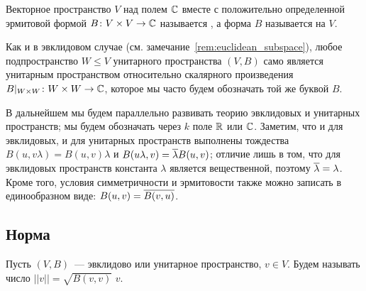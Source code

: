 \begin{definition}
Векторное пространство $V$ над полем $\mathbb C$ вместе с положительно
определенной эрмитовой формой $B\colon V\times V\to\mathbb
C$ называется , а форма $B$ называется
 на $V$.
\end{definition}

\begin{remark}
Как и в эвклидовом случае
(см. замечание~\ref{rem:euclidean_subspace}), любое подпространство
$W\leq V$ унитарного
пространства $(V,B)$ само 
является унитарным пространством относительно скалярного произведения
$B|_{W\times W}\colon W\times W\to\mathbb C$, которое мы часто будем
обозначать той же буквой $B$.
\end{remark}

В дальнейшем мы будем параллельно развивать теорию эвклидовых и
унитарных пространств; мы будем обозначать через $k$ поле $\mathbb R$ или
$\mathbb C$. Заметим, что и для эвклидовых, и для унитарных пространств
выполнены тождества $B(u,v\lambda) = B(u,v)\lambda$ и $B(u\lambda,v) =
\overline\lambda B(u,v)$; отличие лишь в том, что для эвклидовых пространств
константа $\lambda$ является вещественной, поэтому $\overline\lambda =
\lambda$. Кроме того, условия симметричности и эрмитовости также можно
записать в единообразном виде: $B(u,v) = \overline{B(v,u)}$.


\subsection{Норма}


\begin{definition}
Пусть $(V,B)$~--- эвклидово или унитарное пространство, $v\in
V$. Будем называть число
$||v|| = \sqrt{B(v,v)}$  $v$.
\end{definition}

